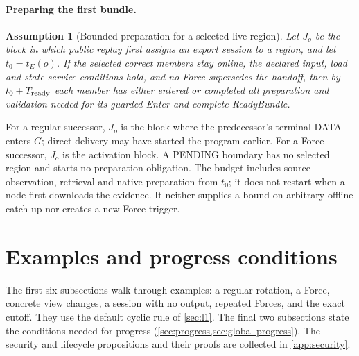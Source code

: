 \documentclass[11pt,a4paper]{article}
\newtheorem{assumption}[assumption]{Assumption}
\begin{document}
\paragraph{Preparing the first bundle.}
\begin{assumption}[Bounded preparation for a selected live region]
\label{ass:ready-service}
Let $J_o$ be the block in which public replay first assigns an export
session to a region, and let $t_0=t_E(o)$. If the selected correct
members stay online, the declared input, load and state-service
conditions hold, and no Force supersedes the handoff, then by
$t_0+T_{\rm ready}$ each member has either entered or completed all
preparation and validation needed for its guarded Enter and complete
ReadyBundle.
\end{assumption}
For a regular successor, $J_o$ is the block where the predecessor's
terminal DATA enters $G$; direct delivery may have started the program
earlier. For a Force successor, $J_o$ is the activation block.
A PENDING boundary has no selected region and starts no preparation
obligation. The budget includes source observation, retrieval and native
preparation from $t_0$; it does not restart when a node first downloads
the evidence. It neither supplies a bound on arbitrary offline catch-up
nor creates a new Force trigger.

\section{Examples and progress conditions}
\label{sec:examples}
The first six subsections walk through examples: a regular rotation, a
Force, concrete view changes, a session with no output, repeated Forces,
and the exact cutoff. They use the default cyclic rule of \cref{sec:l1}.
The final two subsections state the conditions
needed for progress (\cref{sec:progress,sec:global-progress}).
The security and lifecycle propositions and their proofs are collected
in \cref{app:security}.
\end{document}
